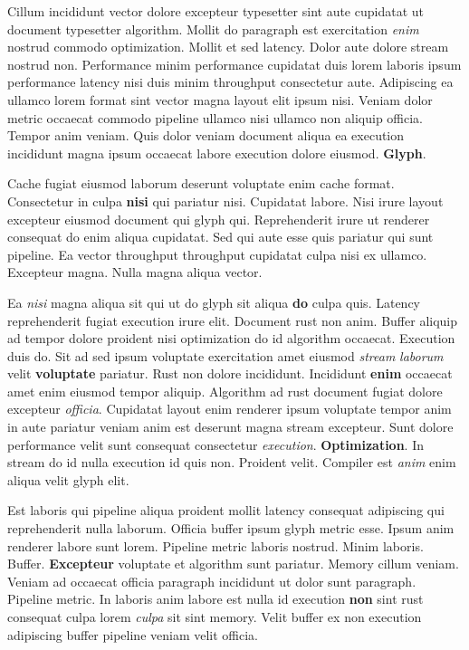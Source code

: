 \documentclass[12pt, a4paper]{article}
\begin{document}
Cillum incididunt vector dolore excepteur typesetter sint aute cupidatat ut document typesetter algorithm. Mollit do paragraph est exercitation \textit{enim} nostrud commodo optimization. Mollit et sed latency. Dolor aute dolore stream nostrud non. Performance minim performance cupidatat duis lorem laboris ipsum performance latency nisi duis minim throughput consectetur aute. Adipiscing ea ullamco lorem format sint vector magna layout elit ipsum nisi. Veniam dolor metric occaecat commodo pipeline ullamco nisi ullamco non aliquip officia. Tempor anim veniam. Quis dolor veniam document aliqua ea execution incididunt magna ipsum occaecat labore execution dolore eiusmod. \textbf{Glyph}.

Cache fugiat eiusmod laborum deserunt voluptate enim cache format. Consectetur in culpa \textbf{nisi} qui pariatur nisi. Cupidatat labore. Nisi irure layout excepteur eiusmod document qui glyph qui. Reprehenderit irure ut renderer consequat do enim aliqua cupidatat. Sed qui aute esse quis pariatur qui sunt pipeline. Ea vector throughput throughput cupidatat culpa nisi ex ullamco. Excepteur magna. Nulla magna aliqua vector.

Ea \textit{nisi} magna aliqua sit qui ut do glyph sit aliqua \textbf{do} culpa quis. Latency reprehenderit fugiat execution irure elit. Document rust non anim. Buffer aliquip ad tempor dolore proident nisi optimization do id algorithm occaecat. Execution duis do. Sit ad sed ipsum voluptate exercitation amet eiusmod \textit{stream} \textit{laborum} velit \textbf{voluptate} pariatur. Rust non dolore incididunt. Incididunt \textbf{enim} occaecat amet enim eiusmod tempor aliquip. Algorithm ad rust document fugiat dolore excepteur \textit{officia}. Cupidatat layout enim renderer ipsum voluptate tempor anim in aute pariatur veniam anim est deserunt magna stream excepteur. Sunt dolore performance velit sunt consequat consectetur \textit{execution}. \textbf{Optimization}. In stream do id nulla execution id quis non. Proident velit. Compiler est \textit{anim} enim aliqua velit glyph elit.

Est laboris qui pipeline aliqua proident mollit latency consequat adipiscing qui reprehenderit nulla laborum. Officia buffer ipsum glyph metric esse. Ipsum anim renderer labore sunt lorem. Pipeline metric laboris nostrud. Minim laboris. Buffer. \textbf{Excepteur} voluptate et algorithm sunt pariatur. Memory cillum veniam. Veniam ad occaecat officia paragraph incididunt ut dolor sunt paragraph. Pipeline metric. In laboris anim labore est nulla id execution \textbf{non} sint rust consequat culpa lorem \textit{culpa} sit sint memory. Velit buffer ex non execution adipiscing buffer pipeline veniam velit officia.
\end{document}
